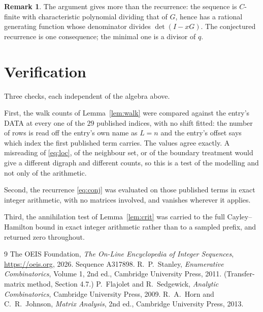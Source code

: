 \documentclass[11pt,a4paper]{article}
\theoremstyle{plain}
\theoremstyle{definition}
\newtheorem{remark}[theorem]{Remark}
\begin{document}
\begin{remark}
The argument gives more than the recurrence: the sequence is $C$-finite with characteristic
polynomial dividing that of $G$, hence has a rational generating function whose denominator
divides $\det(I-xG)$. The conjectured recurrence is one consequence; the minimal one is a
divisor of $q$.
\end{remark}

\section{Verification}

Three checks, each independent of the algebra above.

First, the walk counts of Lemma~\ref{lem:walk} were compared against the entry's DATA at
every one of the $29$ published indices, with no shift fitted: the number of rows is
read off the entry's own name as $L=n$ and the entry's offset says which index the first
published term carries. The values agree exactly. A misreading of \eqref{eq:loc}, of the
neighbour set, or of the boundary treatment would give a different digraph and different
counts, so this is a test of the modelling and not only of the arithmetic.

Second, the recurrence \eqref{eq:conj} was evaluated on those published terms in exact
integer arithmetic, with no matrices involved, and vanishes wherever it applies.

Third, the annihilation test of Lemma~\ref{lem:crit} was carried to the full
Cayley--Hamilton bound in exact integer arithmetic rather than to a sampled prefix, and
returned zero throughout.

\begin{thebibliography}{9}
 The OEIS Foundation, \emph{The On-Line Encyclopedia of Integer
Sequences}, \url{https://oeis.org}, 2026. Sequence A317898.
 R.~P.~Stanley, \emph{Enumerative Combinatorics}, Volume 1, 2nd ed.,
Cambridge University Press, 2011. (Transfer-matrix method, Section 4.7.)
 P.~Flajolet and R.~Sedgewick, \emph{Analytic Combinatorics}, Cambridge
University Press, 2009.
 R.~A.~Horn and C.~R.~Johnson, \emph{Matrix Analysis}, 2nd ed., Cambridge
University Press, 2013.
\end{thebibliography}
\end{document}
